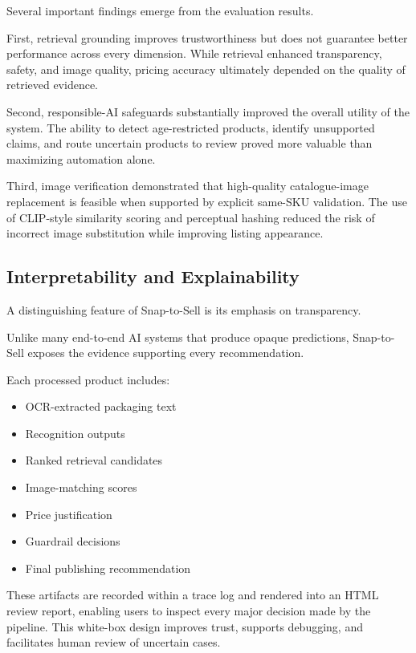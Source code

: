 \documentclass[conference]{IEEEtran}
\begin{document}
Several important findings emerge from the evaluation results.

First, retrieval grounding improves trustworthiness but does not guarantee
better performance across every dimension.
While retrieval enhanced transparency, safety, and image quality,
pricing accuracy ultimately depended on the quality of retrieved evidence. 

Second, responsible-AI safeguards substantially improved the overall utility
of the system.
The ability to detect age-restricted products,
identify unsupported claims,
and route uncertain products to review proved more valuable than maximizing
automation alone. 

Third, image verification demonstrated that high-quality catalogue-image
replacement is feasible when supported by explicit same-SKU validation.
The use of CLIP-style similarity scoring and perceptual hashing reduced the
risk of incorrect image substitution while improving listing appearance. 

\subsection{Interpretability and Explainability}

A distinguishing feature of Snap-to-Sell is its emphasis on transparency.

Unlike many end-to-end AI systems that produce opaque predictions,
Snap-to-Sell exposes the evidence supporting every recommendation.

Each processed product includes:

\begin{itemize}
\item OCR-extracted packaging text
\item Recognition outputs
\item Ranked retrieval candidates
\item Image-matching scores
\item Price justification
\item Guardrail decisions
\item Final publishing recommendation
\end{itemize}

These artifacts are recorded within a trace log and rendered into an HTML
review report, enabling users to inspect every major decision made by the
pipeline. This white-box design improves trust, supports debugging, and
facilitates human review of uncertain cases. 
\end{document}
